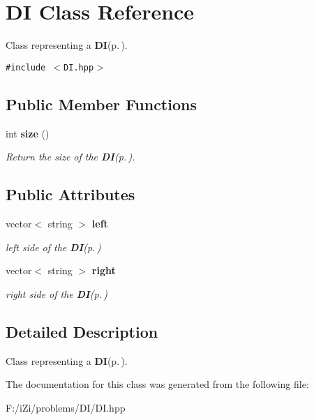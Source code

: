 \section{DI Class Reference}
\label{class_d_i}
Class representing a {\bf DI}{\rm (p.\,\pageref{class_d_i})}.  


{\tt \#include $<$DI.hpp$>$}

\subsection*{Public Member Functions}
\begin{CompactItemize}
\item 
int {\bf size} ()\label{class_d_i_590cdc5b7377492d84118507cf5ff05f}

\begin{CompactList}\small\item\em Return the size of the {\bf DI}{\rm (p.\,\pageref{class_d_i})}. \item\end{CompactList}\end{CompactItemize}
\subsection*{Public Attributes}
\begin{CompactItemize}
\item 
vector$<$ string $>$ {\bf left}\label{class_d_i_6ebc08892cc778a640d12e4646c1b64d}

\begin{CompactList}\small\item\em left side of the {\bf DI}{\rm (p.\,\pageref{class_d_i})} \item\end{CompactList}\item 
vector$<$ string $>$ {\bf right}\label{class_d_i_c6773f874c46eb1d4318db72bd7b592a}

\begin{CompactList}\small\item\em right side of the {\bf DI}{\rm (p.\,\pageref{class_d_i})} \item\end{CompactList}\end{CompactItemize}


\subsection{Detailed Description}
Class representing a {\bf DI}{\rm (p.\,\pageref{class_d_i})}. 



The documentation for this class was generated from the following file:\begin{CompactItemize}
\item 
F:/i\-Zi/problems/DI/DI.hpp\end{CompactItemize}
